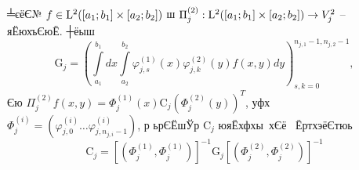 \documentclass[12pt, a4paper, oneside]{article}
\begin{document}
\begin{Lem}\label{Proj35} ╧єёЄ№ $f\in {\rm L}^2([a_1;b_1]\times [a_2;b_2])$ ш $\Pi_j^{(2)} : {\rm L}^2([a_1;b_1]\times [a_2;b_2])\to V_j^2$ -- яЁюхъЄюЁ. ┼ёыш
\begin{equation}\label{G35}
\mathrm{G}_j=\left(\int\limits_{a_1}^{b_1}dx\int\limits_{a_2}^{b_2}\varphi_{j,s}^{(1)}(x)\varphi_{j,k}^{(2)}(y)f(x,y)dy\right)_{s,k=0}^{n_{j,1}-1,n_{j,2}-1},
\end{equation}
Єю $\Pi_j^{(2)}f (x,y)=\Phi_j^{(1)}(x)\mathrm{C}_j (\Phi_j^{(2)}(y))^T$, уфх $\Phi_j^{(i)}=(\varphi_{j,0}^{(i)}\dots \varphi_{j,n_{j,i}-1}^{(i)})$, р ьрЄЁшЎр $\mathrm{C}_j$ юяЁхфхы хЄё  ЁртхэёЄтюь
\begin{equation}\label{Cj35}
\mathrm{C}_j=[(\Phi_j^{(1)},\Phi_j^{(1)})]^{-1}\mathrm{G}_j[(\Phi_j^{(2)},\Phi_j^{(2)})]^{-1}
\end{equation}
\end{Lem}
\end{document}

